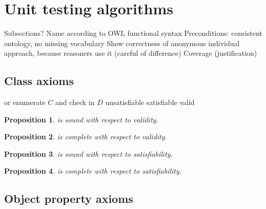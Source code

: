 \documentclass[draft]{sig-alternate}
\newtheorem{proposition}{Proposition}
\let\oldtextproc\textproc
\renewcommand{\textproc}[1]{\nohyphens{\oldtextproc{#1}}}
\begin{document}
\section{Unit testing algorithms}
\label{sec:algorithms}

\begin{todos}
  \todo Subsections?
  \todo Name according to OWL functional syntax
  \todo Preconditions: consistent ontology, no missing vocabulary
  \todo Show correctness of anonymous individual approach, because reasoners use it (careful of difference)
  \todo Coverage (justification)
\end{todos}

\subsection{Class axioms}

\begin{algorithm}[H]
  \caption{}
  \begin{algorithmic}[1]
        \Comment or enumerate $C$ and check in $D$
        \State \Return unsatisfiable
        \State \Return satisfiable
      \Else
        \State \Return valid
      \EndIf
    \EndFunction
  \end{algorithmic}
\end{algorithm}

\begin{proposition}
   is sound with respect to validity.
\end{proposition}

\begin{proposition}
   is complete with respect to validity.
\end{proposition}

\begin{proposition}
   is sound with respect to satisfiability.
\end{proposition}

\begin{proposition}
   is complete with respect to satisfiability.
\end{proposition}

\subsection{Object property axioms}
\end{document}
